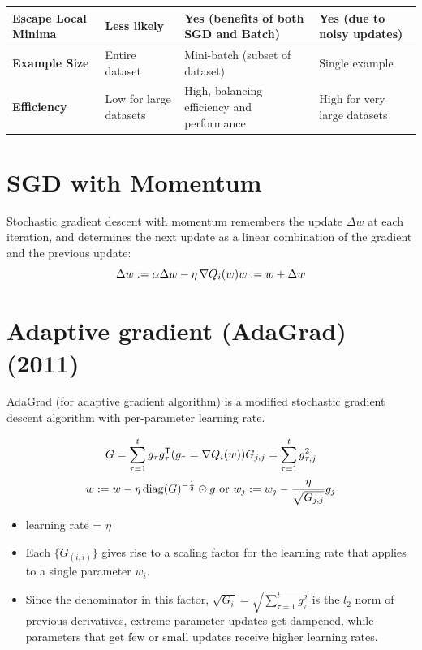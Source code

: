 \begin{longtable}{|p{2.5cm}|p{4cm}|p{3.5cm}|p{3.5cm}|}
    \textbf{Escape Local Minima} & Less likely & Yes (benefits of both SGD and Batch) & Yes (due to noisy updates) \\
    \hline
    
    \textbf{Example Size} & Entire dataset & Mini-batch (subset of dataset) & Single example \\
    \hline
    
    \textbf{Efficiency} & Low for large datasets & High, balancing efficiency and performance & High for very large datasets \\
    \hline

\end{longtable}


\section{SGD with Momentum \cite{wiki-Stochastic_gradient_descent}}\label{SGD with Momentum}
Stochastic gradient descent with momentum remembers the update $\Delta w$ at each iteration, and determines the next update as a linear combination of the gradient and the previous update:
\[
    {\displaystyle \Delta w:=\alpha \Delta w-\eta \,\nabla Q_{i}(w)}
    \hfill
    {\displaystyle w:=w+\Delta w}
\]

\section{Adaptive gradient (AdaGrad) (2011) \cite{wiki-Stochastic_gradient_descent}}\label{Adaptive gradient (AdaGrad)}
AdaGrad (for adaptive gradient algorithm) is a modified stochastic gradient descent algorithm with per-parameter learning rate.

\[
    {\displaystyle G=\sum _{\tau =1}^{t}g_{\tau }g_{\tau }^{\mathsf {T}}}
    \hfill
    ({\displaystyle g_{\tau }=\nabla Q_{i}(w)})
    \hfill
    {\displaystyle G_{j,j}=\sum _{\tau =1}^{t}g_{\tau ,j}^{2}}
\]
\[
    {\displaystyle w:=w-\eta \,\mathrm {diag} (G)^{-{\frac {1}{2}}}\odot g} 
    \hfill \text{ or } \hfill
    {\displaystyle w_{j}:=w_{j}-{\frac {\eta }{\sqrt {G_{j,j}}}}g_{j}}
\]

\begin{itemize}
    \item learning rate = $\eta$

    \item Each $\{G_{(i,i)}\}$ gives rise to a scaling factor for the learning rate that applies to a single parameter $w_i$.

    \item Since the denominator in this factor, ${\displaystyle {\sqrt {G_{i}}}={\sqrt {\sum _{\tau =1}^{t}g_{\tau }^{2}}}}$ is the $l_2$ norm of previous derivatives, extreme parameter updates get dampened, while parameters that get few or small updates receive higher learning rates.    
\end{itemize}


